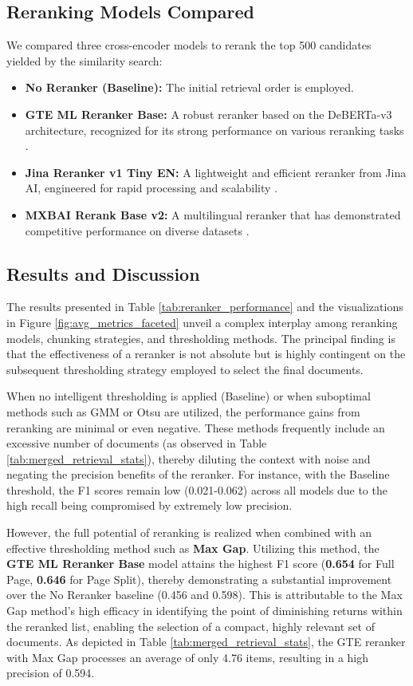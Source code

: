\subsection{Reranking Models Compared}
We compared three cross-encoder models to rerank the top 500 candidates yielded by the similarity search:
\begin{itemize}
    \item \textbf{No Reranker (Baseline):} The initial retrieval order is employed.
    \item \textbf{GTE ML Reranker Base:} A robust reranker based on the DeBERTa-v3 architecture, recognized for its strong performance on various reranking tasks \autocite{zhang2024mgte}.
    \item \textbf{Jina Reranker v1 Tiny EN:} A lightweight and efficient reranker from Jina AI, engineered for rapid processing and scalability \autocite{jina-reranker-v1-tiny-en}.
    \item \textbf{MXBAI Rerank Base v2:} A multilingual reranker that has demonstrated competitive performance on diverse datasets \autocite{v2rerank2025mxbai}.
\end{itemize}

\subsection{Results and Discussion}

The results presented in Table \ref{tab:reranker_performance} and the visualizations in Figure \ref{fig:avg_metrics_faceted} unveil a complex interplay among reranking models, chunking strategies, and thresholding methods. The principal finding is that the effectiveness of a reranker is not absolute but is highly contingent on the subsequent thresholding strategy employed to select the final documents.

When no intelligent thresholding is applied (Baseline) or when suboptimal methods such as GMM or Otsu are utilized, the performance gains from reranking are minimal or even negative. These methods frequently include an excessive number of documents (as observed in Table \ref{tab:merged_retrieval_stats}), thereby diluting the context with noise and negating the precision benefits of the reranker. For instance, with the Baseline threshold, the F1 scores remain low (0.021-0.062) across all models due to the high recall being compromised by extremely low precision.

However, the full potential of reranking is realized when combined with an effective thresholding method such as \textbf{Max Gap}. Utilizing this method, the \textbf{GTE ML Reranker Base} model attains the highest F1 score (\textbf{0.654} for Full Page, \textbf{0.646} for Page Split), thereby demonstrating a substantial improvement over the No Reranker baseline (0.456 and 0.598). This is attributable to the Max Gap method's high efficacy in identifying the point of diminishing returns within the reranked list, enabling the selection of a compact, highly relevant set of documents. As depicted in Table \ref{tab:merged_retrieval_stats}, the GTE reranker with Max Gap processes an average of only 4.76 items, resulting in a high precision of 0.594.

